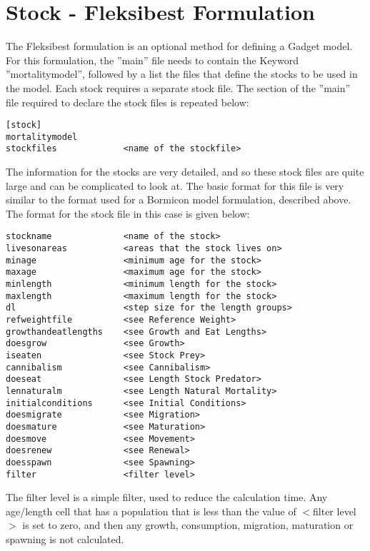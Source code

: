 \documentclass [a4paper, 10pt]{book}
\begin{document}
\section{Stock - Fleksibest Formulation}\label{sec:fleksistock}
The Fleksibest formulation is an optional method for defining a Gadget model.  For this formulation, the ''main'' file needs to contain the Keyword ''mortalitymodel'', followed by a list the files that define the stocks to be used in the model.  Each stock requires a separate stock file.  The section of the ''main'' file required to declare the stock files is repeated below:

\begin{verbatim}
[stock]
mortalitymodel
stockfiles             <name of the stockfile>
\end{verbatim}

The information for the stocks are very detailed, and so these stock files are quite large and can be complicated to look at.  The basic format for this file is very similar to the format used for a Bormicon model formulation, described above.  The format for the stock file in this case is given below:

\begin{verbatim}
stockname              <name of the stock>
livesonareas           <areas that the stock lives on>
minage                 <minimum age for the stock>
maxage                 <maximum age for the stock>
minlength              <minimum length for the stock>
maxlength              <maximum length for the stock>
dl                     <step size for the length groups>
refweightfile          <see Reference Weight>
growthandeatlengths    <see Growth and Eat Lengths>
doesgrow               <see Growth>
iseaten                <see Stock Prey>
cannibalism            <see Cannibalism>
doeseat                <see Length Stock Predator>
lennaturalm            <see Length Natural Mortality>
initialconditions      <see Initial Conditions>
doesmigrate            <see Migration>
doesmature             <see Maturation>
doesmove               <see Movement>
doesrenew              <see Renewal>
doesspawn              <see Spawning>
filter                 <filter level>
\end{verbatim}

The filter level is a simple filter, used to reduce the calculation time.  Any age/length cell that has a population that is less than the value of $<$filter level$>$ is set to zero, and then any growth, consumption, migration, maturation or spawning is not calculated.
\end{document}

